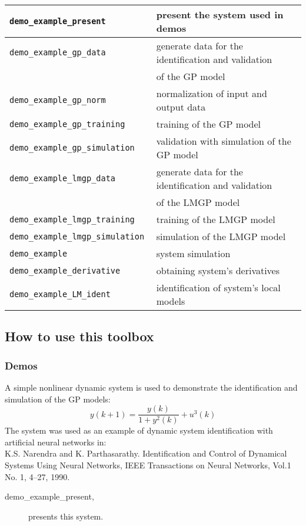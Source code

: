 \documentclass[12pt,twoside]{article}
\newcommand{\fun}[1]{\tt #1}
\begin{document}
{\begin{tabular}{|l|l|}
 \hline \fun{demo\_example\_present} & present the system used in demos  \\
 \hline \fun{demo\_example\_gp\_data} & generate data for the identification and validation  \\
 & of the GP model \\
 \hline \fun{demo\_example\_gp\_norm} & normalization of input and output data \\
 \hline \fun{demo\_example\_gp\_training} & training of the GP model \\
 \hline \fun{demo\_example\_gp\_simulation} & validation with simulation of the GP model \\
 \hline \fun{demo\_example\_lmgp\_data} & generate data for the identification and validation \\
 &  of the LMGP model \\
 \hline \fun{demo\_example\_lmgp\_training} & training of the LMGP model \\
 \hline \fun{demo\_example\_lmgp\_simulation} & simulation of the LMGP model\\
 \hline \fun{demo\_example} & system simulation\\
 \hline \fun{demo\_example\_derivative} & obtaining system's derivatives\\
 \hline \fun{demo\_example\_LM\_ident} & identification of system's local models \\ \hline
\end{tabular}


} %


\clearpage


\subsection{How to use this toolbox}


\subsubsection{Demos}

A simple nonlinear dynamic system is used to demonstrate the
identification and simulation of the GP models:
 \begin{equation}
 y(k+1) = \frac{y(k)}{1+y^2(k)} + u^3(k) \label{eq:narendra}
 \end{equation}
 The system was used as an example of dynamic system identification
 with artificial neural networks in: \\
 K.S. Narendra and K. Parthasarathy. Identification
 and Control of Dynamical Systems Using Neural Networks,
 IEEE Transactions on Neural Networks, Vol.1 No. 1, 4--27, 1990.
 \begin{description}
 \item [demo\_example\_present,] presents this
 system.
 \end{description}
\end{document}
